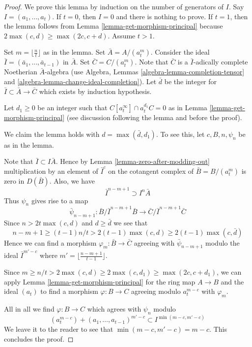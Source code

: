 \begin{proof}
We prove this lemma by induction on the number of generators of $I$.
Say $I = (a_1, \ldots, a_t)$. If $t = 0$, then $I = 0$ and there
is nothing to prove. If $t = 1$, then the lemma follows from
Lemma \ref{lemma-get-morphism-principal} because
$2\max(c, d) \geq \max(2c, c + d)$. Assume $t > 1$.

\medskip\noindent
Set $m = \lfloor \frac{n}{t} \rfloor$ as in the lemma.
Set $\bar A = A/(a_t^m)$. Consider the ideal
$\bar I = (\bar a_1, \ldots, \bar a_{t - 1})$ in $\bar A$.
Set $\bar C = C/(a_t^m)$. Note that $\bar C$ is a $\bar I$-adically
complete Noetherian $\bar A$-algebra (use
Algebra, Lemmas \ref{algebra-lemma-completion-tensor} and
\ref{algebra-lemma-change-ideal-completion}).
Let $\bar d$ be the integer for $\bar I \subset \bar A \to \bar C$
which exists by induction hypothesis.

\medskip\noindent
Let $d_1 \geq 0$ be an integer such that $C[a_t^\infty] \cap a_t^{d_1}C = 0$
as in Lemma \ref{lemma-get-morphism-principal} (see discussion following
the lemma and before the proof).

\medskip\noindent
We claim the lemma holds with $d = \max(\bar d, d_1)$.
To see this, let $c, B, n, \psi_n$ be as in the lemma.

\medskip\noindent
Note that $\bar I \subset I\bar A$. Hence by
Lemma \ref{lemma-zero-after-modding-out}
multiplication by an element of $\bar I^c$
on the cotangent complex of $\bar B = B/(a_t^m)$
is zero in $D(\bar B)$. Also, we have
$$
\bar I^{n - m + 1} \supset I^n \bar A
$$
Thus $\psi_n$ gives rise to a map
$$
\bar \psi_{n - m + 1} :
\bar B/\bar I^{n - m + 1}\bar B
\longrightarrow
\bar C/\bar I^{n - m + 1}\bar C
$$
Since $n > 2t\max(c, d)$ and $d \geq \bar d$ we see that
$$
n - m + 1 \geq (t - 1)n/t > 2(t - 1)\max(c, d) \geq 2(t - 1)\max(c, \bar d)
$$
Hence we can find a morphism $\varphi_m : \bar B \to \bar C$
agreeing with $\bar \psi_{n - m + 1}$ modulo the ideal
$\bar I^{m' - c}$ where $m' = \lfloor \frac{n - m + 1}{t - 1} \rfloor$.

\medskip\noindent
Since $m \geq n/t > 2\max(c, d) \geq 2\max(c, d_1) \geq \max(2c, c+ d_1)$,
we can apply Lemma \ref{lemma-get-morphism-principal} for
the ring map $A \to B$ and the ideal $(a_t)$ to
find a morphism $\varphi : B \to C$ agreeing modulo
$a_t^{m - c}$ with $\varphi_m$.

\medskip\noindent
All in all we find $\varphi : B \to C$ which agrees with
$\psi_n$ modulo
$$
(a_t^{m - c}) + (a_1, \ldots, a_{t - 1})^{m' - c}
\subset I^{\min(m - c, m' - c)}
$$
We leave it to the reader to see that
$\min(m - c, m' - c) = m - c$. This concludes the proof.
\end{proof}

